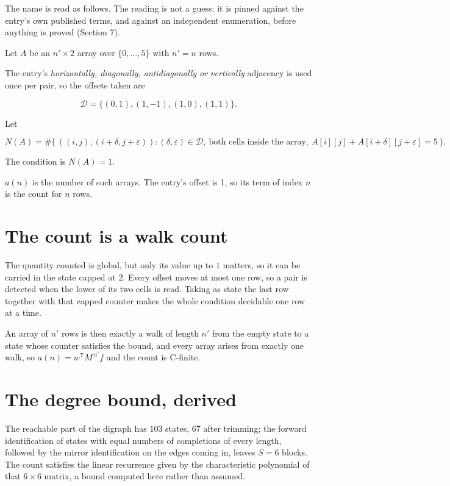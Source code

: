 \documentclass[11pt]{article}
\theoremstyle{definition}
\begin{document}
The name is read as follows. The reading is not a guess: it is pinned against the entry's own published terms, and against an independent enumeration, before anything is proved (Section 7).

Let $A$ be an $n' \times 2$ array over $\{0,\dots,5\}$ with $n' = n$ rows.

The entry's {\itshape horizontally, diagonally, antidiagonally or vertically} adjacency is used once per pair, so the offsets taken are

\[\mathcal{D} = \{(0,1), (1,-1), (1,0), (1,1)\}.\]

Let

\[N(A) = \#\bigl\{\,((i,j),(i{+}\delta,j{+}\varepsilon)) : (\delta,\varepsilon) \in \mathcal{D},\ \text{both cells inside the array},\ A[i][j] + A[i{+}\delta][j{+}\varepsilon] = 5\,\bigr\}.\]

The condition is $N(A) = 1$.

$a(n)$ is the number of such arrays. The entry's offset is 1, so its term of index $n$ is the count for $n$ rows.

\section{The count is a walk count}

The quantity counted is global, but only its value up to $1$ matters, so it can be carried in the state capped at $2$. Every offset moves at most one row, so a pair is detected when the lower of its two cells is read. Taking as state the last row together with that capped counter makes the whole condition decidable one row at a time.

An array of $n'$ rows is then exactly a walk of length $n'$ from the empty state to a state whose counter satisfies the bound, and every array arises from exactly one walk, so $a(n) = w^{\mathsf T}M^{\,n'}f$ and the count is C-finite.

\section{The degree bound, derived}

The reachable part of the digraph has $103$ states, $67$ after trimming; the forward identification of states with equal numbers of completions of every length, followed by the mirror identification on the edges coming in, leaves $S = 6$ blocks. The count satisfies the linear recurrence given by the characteristic polynomial of that $6\times6$ matrix, a bound computed here rather than assumed.
\end{document}
